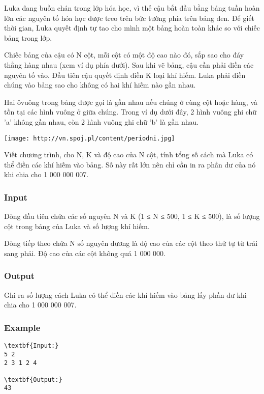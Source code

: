 







   Luka đang buồn chán trong lớp hóa học, vì thế cậu bắt đầu bằng bảng tuần hoàn lớn các nguyên tố hóa học được treo trên bức tường phía trên bảng đen. Để giết thời gian, Luka quyết định tự tao cho mình một bảng hoàn toàn khác so với chiếc bảng trong lớp.  

   Chiếc bảng của cậu có N cột, mỗi cột có một độ cao nào đó, sắp sao cho đáy thẳng hàng nhau (xem ví dụ phía dưới). Sau khi vẽ bảng, cậu cần phải điền các nguyên tố vào. Đầu tiên cậu quyết định điền K loại khí hiếm. Luka phải điền chúng vào bảng sao cho không có hai khí hiếm nào gần nhau.  

   Hai ôvuông trong bảng được gọi là gần nhau nếu chúng ở cùng cột hoặc hàng, và tồn tại các hình vuông ở giữa chúng. Trong ví dụ dưới đây, 2 hình vuông ghi chữ 'a' không gần nhau, còn 2 hình vuông ghi chữ 'b' là gần nhau.  


\texttt{[image: http://vn.spoj.pl/content/periodni.jpg]}

   Viết chương trình, cho N, K và độ cao của N cột, tính tổng số cách mà Luka có thể điền các khí hiếm vào bảng. Số này rất lớn nên chỉ cần in ra phần dư của nó khi chia cho 1 000 000 007.  

\subsubsection{   Input  }

   Dòng đầu tiên chứa các số nguyên N và K (1 ≤ N ≤ 500, 1 ≤ K ≤ 500), là số lượng cột trong bảng của Luka và số lượng khí hiếm.  

   Dòng tiếp theo chứa N số nguyên dương là độ cao của các cột theo thứ tự từ trái sang phải. Độ cao của các cột không quá 1 000 000.  

\subsubsection{   Output  }

   Ghi ra số lượng cách Luka có thể điền các khí hiếm vào bảng lấy phần dư khi chia cho 1 000 000 007.  

\subsubsection{   Example  }
\begin{verbatim}
\textbf{Input:}
5 2
2 3 1 2 4

\textbf{Output:}
43
\end{verbatim}

